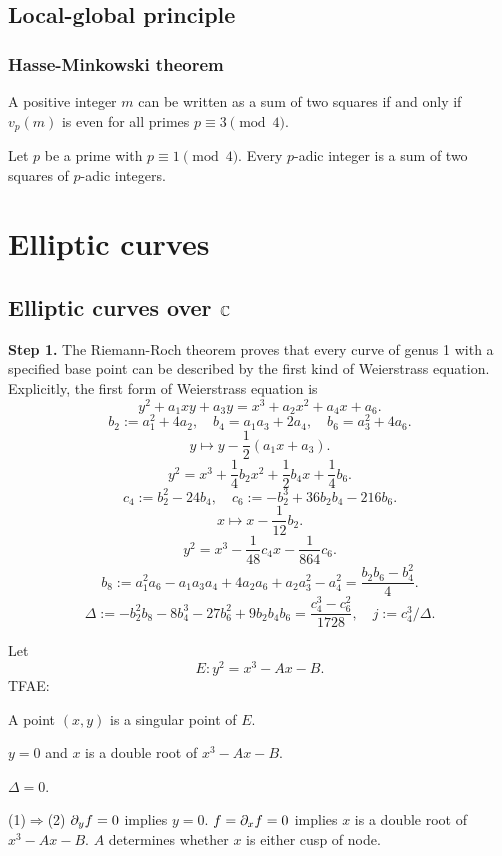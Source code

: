 \documentclass{../../large}
\begin{document}
\chapter{Local-global principle}
\section{Hasse-Minkowski theorem}

\begin{thm}
A positive integer $m$ can be written as a sum of two squares if and only if $v_p(m)$ is even for all primes $p\equiv3\pmod4$.

Let $p$ be a prime with $p\equiv1\pmod4$.
Every $p$-adic integer is a sum of two squares of $p$-adic integers.
\end{thm}





\part{Elliptic curves}
\chapter{Elliptic curves over $\mathbb{C}$}


\textbf{Step 1.}
The Riemann-Roch theorem proves that every curve of genus 1 with a specified base point can be described by the first kind of Weierstrass equation.
Explicitly, the first form of Weierstrass equation is
\[y^2+a_1xy+a_3y=x^3+a_2x^2+a_4x+a_6.\]
\[b_2:=a_1^2+4a_2,\quad b_4=a_1a_3+2a_4,\quad b_6=a_3^2+4a_6.\]
\[y\mapsto y-\frac12(a_1x+a_3).\]
\[y^2=x^3+\frac14b_2x^2+\frac12b_4x+\frac14b_6.\]
\[c_4:=b_2^2-24b_4,\quad c_6:=-b_2^3+36b_2b_4-216b_6.\]
\[x\mapsto x-\frac1{12}b_2.\]
\[y^2=x^3-\frac1{48}c_4x-\frac1{864}c_6.\]
\[b_8:=a_1^2a_6-a_1a_3a_4+4a_2a_6+a_2a_3^2-a_4^2=\frac{b_2b_6-b_4^2}4.\]
\[\Delta:=-b_2^2b_8-8b_4^3-27b_6^2+9b_2b_4b_6=\frac{c_4^3-c_6^2}{1728},\quad j:=c_4^3/\Delta.\]


\begin{thm}
Let
\[E:y^2=x^3-Ax-B.\]
TFAE:
\begin{parts}
\item A point $(x,y)$ is a singular point of $E$.
\item $y=0$ and $x$ is a double root of $x^3-Ax-B$.
\item $\Delta=0$.
\end{parts}
\end{thm}
\begin{pf}
(1)$\Rightarrow$(2)
$\pd_yf=0$ implies $y=0$. $f=\pd_xf=0$ implies $x$ is a double root of $x^3-Ax-B$.
$A$ determines whether $x$ is either cusp of node.
\end{pf}
\end{document}

